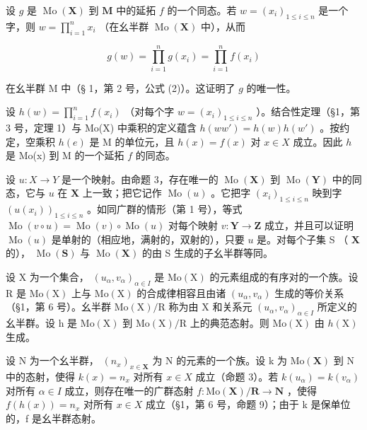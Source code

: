 设 \(g\) 是 \(\operatorname{Mo}(\mathbf{X})\) 到 \(\mathbf{M}\) 中的延拓 \(f\) 的一个同态。若 \(w = (x_{i})_{1 \leqslant i \leqslant n}\) 是一个字，则 \(w = \prod_{i=1}^{n} x_{i}\) （在幺半群 \(\operatorname{Mo}(\mathbf{X})\) 中），从而

\[
g (w) = \prod_ {i = 1} ^ {n} g (x _ {i}) = \prod_ {i = 1} ^ {n} f (x _ {i})
\]

在幺半群 M 中（§ 1，第 2 号，公式 (2)）。这证明了 \(g\) 的唯一性。

设 \(h(w) = \prod_{i=1}^{n} f(x_i)\) （对每个字 \(w = (x_i)_{1 \leqslant i \leqslant n}\) ）。结合性定理（§1，第 3 号，定理 1）与 Mo(X) 中乘积的定义蕴含 \(h(ww') = h(w)h(w')\) 。按约定，空乘积 \(h(e)\) 是 M 的单位元，且 \(h(x) = f(x)\) 对 \(x \in X\) 成立。因此 \(h\) 是 Mo(x) 到 M 的一个延拓 \(f\) 的同态。

设 \(u: X \to Y\) 是一个映射。由命题 3，存在唯一的 \(\operatorname{Mo}(\mathbf{X})\) 到 \(\operatorname{Mo}(\mathbf{Y})\) 中的同态，它与 \(u\) 在 \(\mathbf{X}\) 上一致；把它记作 \(\operatorname{Mo}(u)\) 。它把字 \((x_i)_{1 \leqslant i \leqslant n}\) 映到字 \((u(x_i))_{1 \leqslant i \leqslant n}\) 。如同广群的情形（第 1 号），等式 \(\operatorname{Mo}(v \circ u) = \operatorname{Mo}(v) \circ \operatorname{Mo}(u)\) 对每个映射 \(v: \mathbf{Y} \to \mathbf{Z}\) 成立，并且可以证明 \(\operatorname{Mo}(u)\) 是单射的（相应地，满射的，双射的），只要 \(u\) 是。对每个子集 S （ \(\mathbf{X}\) 的）， \(\operatorname{Mo}(\mathbf{S})\) 与 \(\operatorname{Mo}(\mathbf{X})\) 的由 S 生成的子幺半群等同。

设 X 为一个集合， \((u_{\alpha}, v_{\alpha})_{\alpha \in I}\) 是 \(\mathrm{Mo}(\mathrm{X})\) 的元素组成的有序对的一个族。设 R 是 \(\mathrm{Mo}(\mathrm{X})\) 上与 \(\mathrm{Mo}(\mathrm{X})\) 的合成律相容且由诸 \((u_{\alpha}, v_{\alpha})\) 生成的等价关系（§1，第 6 号）。幺半群 \(\mathrm{Mo}(\mathrm{X})/\mathrm{R}\) 称为由 X 和关系元 \((u_{\alpha}, v_{\alpha})_{\alpha \in I}\) 所定义的幺半群。设 h 是 \(\mathrm{Mo}(\mathrm{X})\) 到 \(\mathrm{Mo}(\mathrm{X})/\mathrm{R}\) 上的典范态射。则 \(\mathrm{Mo}(\mathrm{X})\) 由 \(h(\mathrm{X})\) 生成。

设 N 为一个幺半群， \((n_{x})_{x\in\mathbf{X}}\) 为 N 的元素的一个族。设 k 为 \(\mathrm{Mo}(\mathbf{X})\) 到 N 中的态射，使得 \(k(x)=n_{x}\) 对所有 \(x\in X\) 成立（命题 3）。若 \(k(u_{\alpha})=k(v_{\alpha})\) 对所有 \(\alpha\in I\) 成立，则存在唯一的广群态射 \(f:\mathrm{Mo}(\mathbf{X})/\mathbf{R}\to\mathbf{N}\) ，使得 \(f(h(x))=n_{x}\) 对所有 \(x\in X\) 成立（§1，第 6 号，命题 9）；由于 k 是保单位的，f 是幺半群态射。
\relax{}
